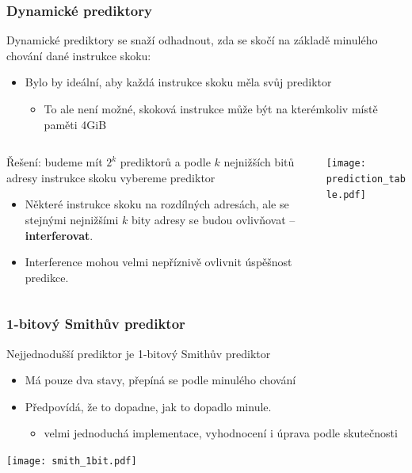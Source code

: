 \documentclass{beamer}
\begin{document}
\begin{frame}
\frametitle{Dynamické prediktory}

\small
Dynamické prediktory se snaží odhadnout, zda se skočí na základě minulého chování dané instrukce skoku:
\begin{itemize}
\item Bylo by ideální, aby každá instrukce skoku měla svůj prediktor
\begin{itemize}
\small
\item To ale není možné, skoková instrukce může být na kterémkoliv místě paměti 4GiB
\end{itemize}
\end{itemize}


\begin{columns}[T]
\begin{column}{0.5\textwidth}
\small
Řešení: budeme mít $2^k$ prediktorů a podle $k$ nejnižších bitů adresy instrukce skoku vybereme prediktor
\begin{itemize}
\item Některé instrukce skoku na rozdílných adresách, ale se stejnými nejnižšími $k$ bity adresy se budou ovlivňovat -- \textbf{interferovat}.
\item Interference mohou velmi nepříznivě ovlivnit úspěšnost predikce.
\end{itemize}
\end{column}
\begin{column}{0.5\textwidth}
\texttt{[image: prediction\_table.pdf]}
\end{column}
\end{columns}

\end{frame}


\begin{frame}
\frametitle{1-bitový Smithův prediktor}

Nejjednodušší prediktor je 1-bitový Smithův prediktor
\begin{itemize}
\item Má pouze dva stavy, přepíná se podle minulého chování
\item Předpovídá, že to dopadne, jak to dopadlo minule.
\begin{itemize}
\item velmi jednoduchá implementace, vyhodnocení i úprava podle skutečnosti
\end{itemize}
\end{itemize}

\begin{center}
\texttt{[image: smith\_1bit.pdf]}
\end{center}

\end{frame}
\end{document}
